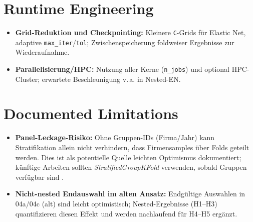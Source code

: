 \section{Runtime Engineering}
\begin{itemize}
  \item \textbf{Grid-Reduktion und Checkpointing:} Kleinere \texttt{C}-Grids für Elastic Net, adaptive \texttt{max\_iter}/\texttt{tol}; Zwischenspeicherung foldweiser Ergebnisse zur Wiederaufnahme.
  \item \textbf{Parallelisierung/HPC:} Nutzung aller Kerne (\texttt{n\_jobs}) und optional HPC-Cluster; erwartete Beschleunigung v.\,a. in Nested-EN.
\end{itemize}

\section{Documented Limitations}
\begin{itemize}
  \item \textbf{Panel-Leckage-Risiko:} Ohne Gruppen-IDs (Firma/Jahr) kann Stratifikation allein nicht verhindern, dass Firmensamples über Folds geteilt werden. Dies ist als potentielle Quelle leichten Optimismus dokumentiert; künftige Arbeiten sollten \emph{StratifiedGroupKFold} verwenden, sobald Gruppen verfügbar sind \parencite{sklearnGroupKFold,sklearnCVGuide}.
  \item \textbf{Nicht-nested Endauswahl im alten Ansatz:} Endgültige Auswahlen in 04a/04c (alt) sind leicht optimistisch; Nested-Ergebnisse (H1--H3) quantifizieren diesen Effekt und werden nachlaufend für H4--H5 ergänzt.
\end{itemize}
